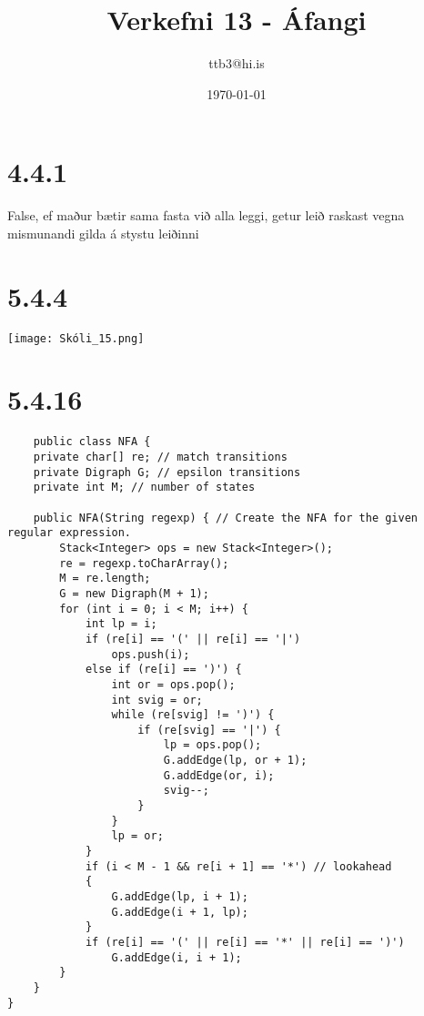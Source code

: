 \documentclass{article}
\title{Verkefni 13 - Áfangi}
\author{ttb3@hi.is}
\date{\today}
\begin{document}
\maketitle


\section*{4.4.1}
False, ef maður bætir sama fasta við alla leggi, getur leið raskast vegna mismunandi gilda á stystu leiðinni

\section*{5.4.4}
\texttt{[image: Skóli\_15.png]}

\newpage
\section*{5.4.16}
\begin{lstlisting}
    public class NFA {
    private char[] re; // match transitions
    private Digraph G; // epsilon transitions
    private int M; // number of states

    public NFA(String regexp) { // Create the NFA for the given regular expression.
        Stack<Integer> ops = new Stack<Integer>();
        re = regexp.toCharArray();
        M = re.length;
        G = new Digraph(M + 1);
        for (int i = 0; i < M; i++) {
            int lp = i;
            if (re[i] == '(' || re[i] == '|')
                ops.push(i);
            else if (re[i] == ')') {
                int or = ops.pop();
                int svig = or;
                while (re[svig] != ')') {
                    if (re[svig] == '|') {
                        lp = ops.pop();
                        G.addEdge(lp, or + 1);
                        G.addEdge(or, i);
                        svig--;
                    }
                }
                lp = or;
            }
            if (i < M - 1 && re[i + 1] == '*') // lookahead
            {
                G.addEdge(lp, i + 1);
                G.addEdge(i + 1, lp);
            }
            if (re[i] == '(' || re[i] == '*' || re[i] == ')')
                G.addEdge(i, i + 1);
        }
    }
}
\end{lstlisting}
\end{document}
